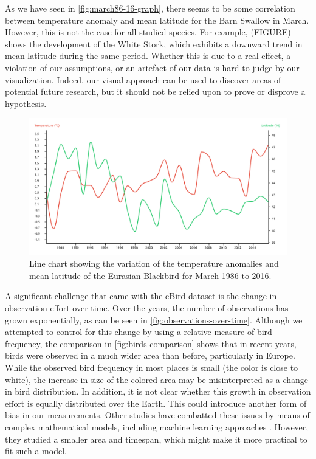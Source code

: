 \documentclass[journal]{vgtc}                %
\begin{document}
As we have seen in \autoref{fig:march86-16-graph}, there seems to be some correlation between temperature anomaly and mean latitude for the Barn Swallow in March. However, this is not the case for all studied species. For example, (FIGURE) shows the development of the White Stork, which exhibits a downward trend in mean latitude during the same period. Whether this is due to a real effect, a violation of our assumptions, or an artefact of our data is hard to judge by our visualization. Indeed, our visual approach can be used to discover areas of potential future research, but it should not be relied upon to prove or disprove a hypothesis.

\begin{figure}[t]
  \centering
  \includegraphics[width=\linewidth]{march86-16-graph-eurbla}
  \caption{Line chart showing the variation of the temperature anomalies and mean latitude of the Eurasian Blackbird for March 1986 to 2016.}
  \label{fig:march86-16-graph-eurbla}
\end{figure}

A significant challenge that came with the eBird dataset is the change in observation effort over time. Over the years, the number of observations has grown exponentially, as can be seen in \autoref{fig:observations-over-time}. Although we attempted to control for this change by using a relative measure of bird frequency, the comparison in \autoref{fig:birds-comparison} shows that in recent years, birds were observed in a much wider area than before, particularly in Europe. While the observed bird frequency in most places is small (the color is close to white), the increase in size of the colored area may be misinterpreted as a change in bird distribution. In addition, it is not clear whether this growth in observation effort is equally distributed over the Earth. This could introduce another form of bias in our measurements. Other studies have combatted these issues by means of complex mathematical models, including machine learning approaches \cite{johnston2019best,johnston2020analytical}. However, they studied a smaller area and timespan, which might make it more practical to fit such a model.
\end{document}
